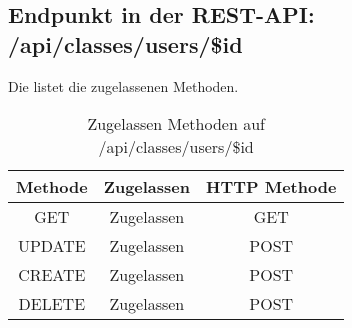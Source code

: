 \subsection{Endpunkt in der REST-API: /api/classes/users/\$id}
Die  listet die zugelassenen Methoden. 

\begin{table}[!htbp]
	\begin{tabular}{|c|c|c|}
		\hline
			\textbf{Methode} & \textbf{Zugelassen} & \textbf{HTTP Methode} \\ \hline
			GET & Zugelassen & GET \\ \hline
			UPDATE & Zugelassen & POST \\ \hline 
			CREATE & Zugelassen & POST \\ \hline 
			DELETE & Zugelassen & POST \\ \hline
	\end{tabular}

		\caption{Zugelassen Methoden auf /api/classes/users/\$id}
		\label{tab:end:rest:api:classes:users:id:meth}
\end{table}